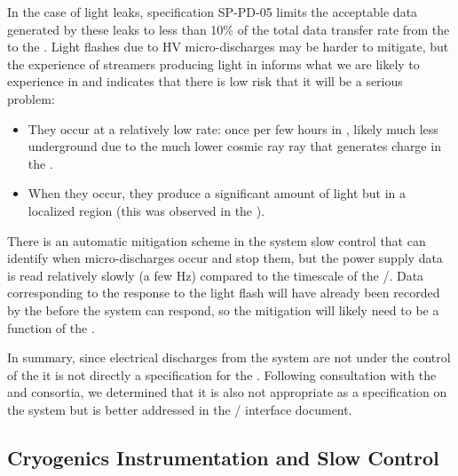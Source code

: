 In the case of light leaks, specification SP-PD-05 limits the acceptable data generated by these leaks to  less than 10\% of the total data transfer rate from the  to the .
Light flashes due to HV micro-discharges may be harder to mitigate, but the experience of streamers producing light in  informs what we are likely to experience in  and indicates that there is low risk that it will be a serious problem:

\begin{itemize}
  
\item They occur at a relatively low rate: once per few hours in , likely much less underground due to the much lower cosmic ray ray that generates charge in the .

\item When they occur, they produce a significant amount of light but in a localized region (this was observed in the  ).

\end{itemize}

There is an automatic mitigation scheme in the  system slow control that can identify when micro-discharges occur and stop them, but the power supply data is read relatively slowly (a few Hz) compared to the timescale of the /. Data corresponding to the  response to the light flash will have already been recorded by the  before the  system can respond, so the mitigation will likely need to be a function of the .

In summary, since electrical discharges from the  system are not under the control of the  it is not directly a specification for the .  
Following consultation with the  and  consortia, we determined that it is also not appropriate as a specification on the  system but is better addressed in the / interface document.


\subsection{Cryogenics Instrumentation and Slow Control}
\label{sec:fdsp-pd-intfc-xeon}

